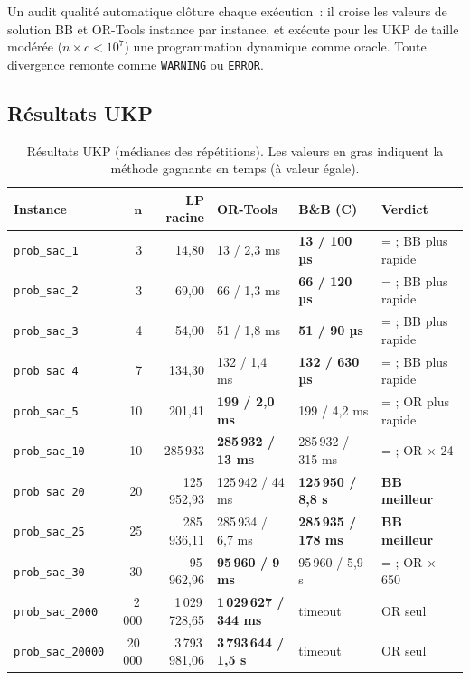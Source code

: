 \documentclass[11pt,a4paper]{article}
\begin{document}
Un audit qualité automatique clôture chaque exécution~: il croise les valeurs de solution BB et OR-Tools instance par instance, et exécute pour les UKP de taille modérée ($n \times c < 10^7$) une programmation dynamique comme oracle. Toute divergence remonte comme \texttt{WARNING} ou \texttt{ERROR}.

\subsection{Résultats UKP}

\begin{table}[!htbp]
\centering
\small
\setlength{\tabcolsep}{4pt}
\begin{tabular}{lrrlll}
\toprule
\textbf{Instance} & $\boldsymbol{n}$ & \textbf{LP racine} & \textbf{OR-Tools} & \textbf{B\&B (C)} & \textbf{Verdict} \\
\midrule
\texttt{prob\_sac\_1}      & 3       & 14{,}80              & 13 / 2{,}3 ms                 & \textbf{13 / 100 µs}         & = ; BB plus rapide \\
\texttt{prob\_sac\_2}      & 3       & 69{,}00              & 66 / 1{,}3 ms                 & \textbf{66 / 120 µs}         & = ; BB plus rapide \\
\texttt{prob\_sac\_3}      & 4       & 54{,}00              & 51 / 1{,}8 ms                 & \textbf{51 / 90 µs}          & = ; BB plus rapide \\
\texttt{prob\_sac\_4}      & 7       & 134{,}30             & 132 / 1{,}4 ms                & \textbf{132 / 630 µs}        & = ; BB plus rapide \\
\texttt{prob\_sac\_5}      & 10      & 201{,}41             & \textbf{199 / 2{,}0 ms}       & 199 / 4{,}2 ms               & = ; OR plus rapide \\
\texttt{prob\_sac\_10}     & 10      & 285\,933             & \textbf{285\,932 / 13 ms}     & 285\,932 / 315 ms            & = ; OR $\times$ 24 \\
\texttt{prob\_sac\_20}     & 20      & 125\,952{,}93        & 125\,942 / 44 ms              & \textbf{125\,950 / 8{,}8 s}  & \textcolor{warning}{\textbf{BB meilleur}} \\
\texttt{prob\_sac\_25}     & 25      & 285\,936{,}11        & 285\,934 / 6{,}7 ms           & \textbf{285\,935 / 178 ms}   & \textcolor{warning}{\textbf{BB meilleur}} \\
\texttt{prob\_sac\_30}     & 30      & 95\,962{,}96         & \textbf{95\,960 / 9 ms}       & 95\,960 / 5{,}9 s            & = ; OR $\times$ 650 \\
\texttt{prob\_sac\_2000}   & 2\,000  & 1\,029\,728{,}65     & \textbf{1\,029\,627 / 344 ms} & timeout                      & OR seul \\
\texttt{prob\_sac\_20000}  & 20\,000 & 3\,793\,981{,}06     & \textbf{3\,793\,644 / 1{,}5 s} & timeout                     & OR seul \\
\bottomrule
\end{tabular}
\caption{Résultats UKP (médianes des répétitions). Les valeurs en gras indiquent la méthode gagnante en temps (à valeur égale).}
\label{tab:ukp}
\end{table}
\end{document}

